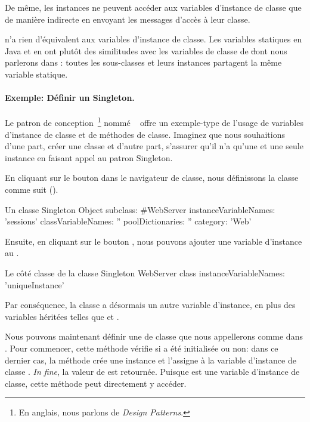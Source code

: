 \documentclass[a4paper,10pt,twoside]{book}
\begin{document}
De même, les instances ne peuvent accéder aux variables d'instance de classe
que de manière indirecte en envoyant les messages d'accès à leur classe.

 n'a rien d'équivalent aux variables d'instance de classe.  
Les variables statiques en Java et en  ont plutôt des similitudes 
avec les variables de classe de \st dont nous parlerons dans : toutes les sous-classes et leurs instances partagent la même variable statique.

\paragraph{Exemple: Définir un Singleton.}
Le patron de conception~\footnote{En anglais, nous parlons de \emph{Design Patterns}.} nommé ~\cite{Alpe98a} offre un exemple-type de l'usage de variables d'instance de classe et de méthodes de classe.
Imaginez que nous souhaitions d'une part, créer une classe  et d'autre part, s'assurer qu'il n'a qu'une et une seule instance en faisant appel au patron Singleton.

En cliquant sur le bouton  dans le navigateur de classe, nous définissons la classe  comme suit ().

\begin{classdef}[singleton]{Un classe Singleton}
Object subclass: #WebServer
	instanceVariableNames: 'sessions' 	
	classVariableNames: '' 	
	poolDictionaries: ''
	category: 'Web'
\end{classdef}

Ensuite, en cliquant sur le bouton , nous pouvons ajouter une variable d'instance  au .

\begin{classdef}[webserver]{Le côté classe de la classe Singleton}
WebServer class 	
	instanceVariableNames: 'uniqueInstance'
\end{classdef}

Par conséquence, la classe  a désormais un autre variable d'instance, en plus des variables héritées telles que  et .

Nous pouvons maintenant définir une  de classe que nous appellerons  comme dans . 
Pour commencer, cette méthode vérifie si  a été initialisée ou non: dans ce dernier cas,
la méthode crée une instance et l'assigne à la variable d'instance de classe .  
\emph{In fine}, la valeur de  est retournée.
Puisque  est une variable d'instance de classe, cette méthode peut directement y accéder.
    
\end{document}
